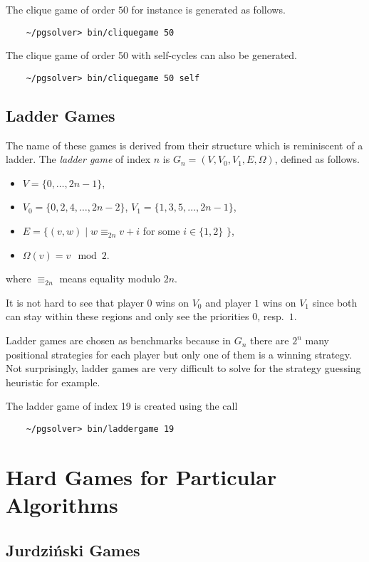 The clique game of order $50$ for instance is generated as follows.
\begin{verbatim}
    ~/pgsolver> bin/cliquegame 50
\end{verbatim}
The clique game of order 50 with self-cycles can also be generated.
\begin{verbatim}
    ~/pgsolver> bin/cliquegame 50 self
\end{verbatim}


\subsection{Ladder Games}
\label{sec:laddergame}

The name of these games is derived from their structure which is reminiscent of a ladder. The
\emph{ladder game} of index $n$ is $G_n = (V,V_0,V_1,E,\Omega)$, defined as follows.
\begin{itemize}
\item $V = \{0,\ldots,2n-1\}$,
\item $V_0 = \{0,2,4,\ldots,2n-2\}$, $V_1 = \{1,3,5,\ldots,2n-1\}$,
\item $E = \{ (v,w) \mid w \equiv_{2n} v+i $ for some $i \in \{1,2\}$ $\}$,
\item $\Omega(v) = v \mod 2$.
\end{itemize}
where $\equiv_{2n}$ means equality modulo $2n$.

It is not hard to see that player $0$ wins on $V_0$ and player $1$ wins on $V_1$ since both can
stay within these regions and only see the priorities $0$, resp.\ $1$.

Ladder games are chosen as benchmarks because in $G_n$ there are $2^n$ many positional strategies for each
player but only one of them is a winning strategy. Not surprisingly, ladder games are very difficult
to solve for the strategy guessing heuristic for example.

The ladder game of index 19 is created using the call
\begin{verbatim}
    ~/pgsolver> bin/laddergame 19
\end{verbatim}


\section{Hard Games for Particular  Algorithms}


\subsection{Jurdzi{\'n}ski Games}
\label{sec:jurdgame}

